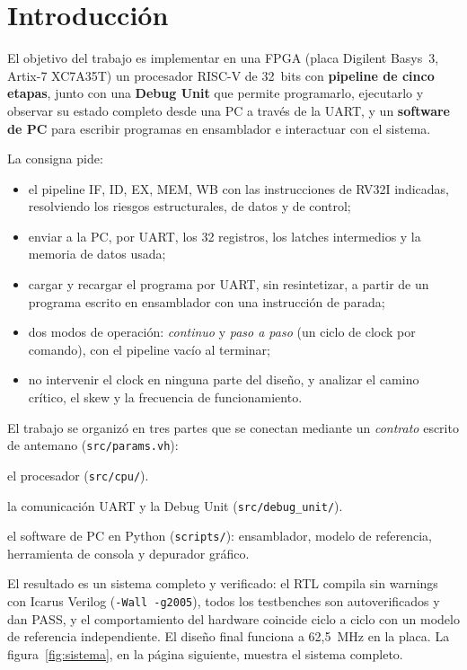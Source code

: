 \documentclass[12pt,a4paper]{article}
\begin{document}
\section{Introducción}

El objetivo del trabajo es implementar en una FPGA (placa Digilent Basys~3,
Artix-7 XC7A35T) un procesador RISC-V de 32~bits con \textbf{pipeline de cinco
etapas}, junto con una \textbf{Debug Unit} que permite programarlo, ejecutarlo y
observar su estado completo desde una PC a través de la UART, y un
\textbf{software de PC} para escribir programas en ensamblador e interactuar con
el sistema.

La consigna pide:
\begin{itemize}[nosep]
  \item el pipeline IF, ID, EX, MEM, WB con las instrucciones de RV32I
        indicadas, resolviendo los riesgos estructurales, de datos y de control;
  \item enviar a la PC, por UART, los 32 registros, los latches intermedios y la
        memoria de datos usada;
  \item cargar y recargar el programa por UART, sin resintetizar, a partir de
        un programa escrito en ensamblador con una instrucción de parada;
  \item dos modos de operación: \emph{continuo} y \emph{paso a paso} (un ciclo
        de clock por comando), con el pipeline vacío al terminar;
  \item no intervenir el clock en ninguna parte del diseño, y analizar el camino
        crítico, el skew y la frecuencia de funcionamiento.
\end{itemize}

El trabajo se organizó en tres partes que se conectan mediante un
\emph{contrato} escrito de antemano (\texttt{src/params.vh}):

\begin{description}[nosep,leftmargin=1.2cm,style=nextline]
  \item[Parte A] el procesador (\texttt{src/cpu/}).
  \item[Parte B] la comunicación UART y la Debug Unit (\texttt{src/debug\_unit/}).
  \item[Parte C] el software de PC en Python (\texttt{scripts/}): ensamblador,
        modelo de referencia, herramienta de consola y depurador gráfico.
\end{description}

El resultado es un sistema completo y verificado: el RTL compila sin warnings
con Icarus Verilog (\texttt{-Wall -g2005}), todos los testbenches son
autoverificados y dan PASS, y el comportamiento del hardware coincide ciclo a
ciclo con un modelo de referencia independiente. El diseño final funciona a
62,5~MHz en la placa. La figura~\ref{fig:sistema}, en la página siguiente,
muestra el sistema completo.
\end{document}
